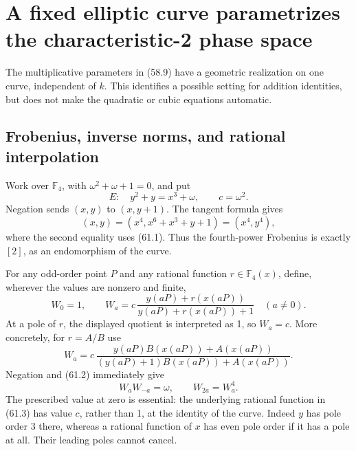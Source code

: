 \documentclass[11pt,reqno]{amsart}
\theoremstyle{plain}
\begin{document}
\section{A fixed elliptic curve parametrizes the characteristic-2 phase space}\label{sec:61}

The multiplicative parameters in (58.9) have a geometric realization on
one curve, independent of \(k\). This identifies a possible setting for
addition identities, but does not make the quadratic or cubic equations
automatic.

\subsection{Frobenius, inverse norms, and rational interpolation}\label{sec:61.1}

Work over \(\mathbb F_4\), with \(\omega^2+\omega+1=0\), and put
\begin{equation*}
 E:\quad y^2+y=x^3+\omega,\qquad c=\omega^2.
 \tag{61.1}
\end{equation*}
Negation sends \((x,y)\) to \((x,y+1)\). The tangent formula gives
\begin{equation*}
 [2](x,y)=(x^4,x^6+x^3+y+1)=(x^4,y^4),
 \tag{61.2}
\end{equation*}
where the second equality uses (61.1). Thus the fourth-power Frobenius
is exactly \([2]\), as an endomorphism of the curve.

For any odd-order point \(P\) and any rational function
\(r\in\mathbb F_4(x)\), define, wherever the values are nonzero and
finite,
\begin{equation*}
 W_0=1,\qquad
 W_a=c\,\frac{y(aP)+r(x(aP))}{y(aP)+r(x(aP))+1}
 \quad(a\ne0).
 \tag{61.3}
\end{equation*}
At a pole of \(r\), the displayed quotient is interpreted as 1,
so \(W_a=c\). More concretely, for \(r=A/B\) use
\begin{equation*}
 W_a=c\,\frac{y(aP)B(x(aP))+A(x(aP))}
                  {(y(aP)+1)B(x(aP))+A(x(aP))}.
 \tag{61.4}
\end{equation*}
Negation and (61.2) immediately give
\begin{equation*}
 W_aW_{-a}=\omega,\qquad W_{2a}=W_a^4.
 \tag{61.5}
\end{equation*}
The prescribed value at zero is essential: the underlying rational
function in (61.3) has value \(c\), rather than 1, at the identity of
the curve. Indeed \(y\) has pole order 3 there, whereas a rational
function of \(x\) has even pole order if it has a pole at all. Their
leading poles cannot cancel.
\end{document}
